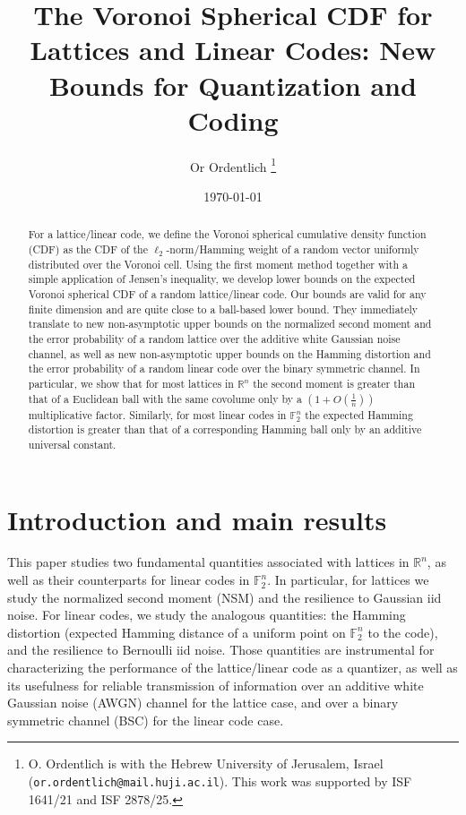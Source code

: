 \documentclass[article,doublecolumn]{IEEEtran}
\title{The Voronoi Spherical CDF for Lattices and Linear Codes: New Bounds for Quantization and Coding}
\author{Or Ordentlich %
\thanks{O. Ordentlich is with the %
Hebrew University of Jerusalem, Israel (\texttt{or.ordentlich@mail.huji.ac.il}). This work was supported by ISF 1641/21 and ISF 2878/25. }
}
\newcommand{\F}{{\mathbb{F}}}
\newcommand{\R}{{\mathbb{R}}}
\begin{document}
	\date{\today}
	\maketitle
	
\begin{abstract}
For a lattice/linear code, we define the Voronoi spherical cumulative density function (CDF) as the CDF of the $\ell_2$-norm/Hamming weight of a random vector uniformly distributed over the Voronoi cell. Using the first moment method together with a simple application of Jensen's inequality, we develop lower bounds on the expected Voronoi spherical CDF of a random lattice/linear code. Our bounds are valid for any finite dimension and are quite close to a  ball-based lower bound. They immediately translate to new non-asymptotic upper bounds on the normalized second moment and the error probability of a random lattice over the additive white Gaussian noise channel, as well as new non-asymptotic upper bounds on the Hamming distortion and the error probability of a random linear code over the binary symmetric channel. In particular, we show that for most lattices in $\mathbb{R}^n$ the second moment is  greater than that of a Euclidean ball with the same covolume only by a  $\left(1+O(\frac{1}{n})\right)$ multiplicative factor. Similarly, for most linear codes in $\mathbb{F}_2^n$ the expected Hamming distortion is greater than that of a corresponding Hamming ball only by an additive universal constant.
\end{abstract}
	
\section{Introduction and main results}

This paper studies two fundamental quantities associated with lattices in $\R^n$, as well as their counterparts for linear codes in $\F_2^n$. In particular, for lattices we study the normalized second moment (NSM) and the resilience to Gaussian iid noise. For linear codes, we study the analogous quantities: the Hamming distortion (expected Hamming distance of a uniform point on $\F_2^n$ to the code), and the resilience to Bernoulli iid noise. Those quantities are instrumental for characterizing the performance of the lattice/linear code as a quantizer, as well as its usefulness for reliable transmission of information over an additive white Gaussian noise (AWGN) channel  for the lattice case, and over a binary symmetric channel (BSC) for the linear code case.
\end{document}
